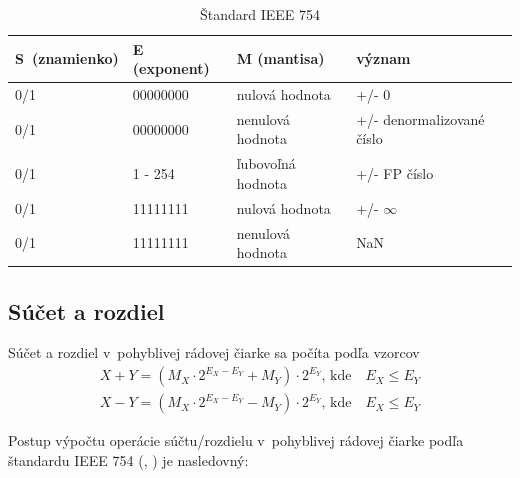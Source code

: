 \bigskip
\begin{table}[h]
\centering
\begin{tabular}{|l|l|l|l|}
\hline
\rowcolor[HTML]{C0C0C0} 
S~(znamienko) & E (exponent) & M (mantisa)       & význam                    \\ \hline
0/1           & 00000000     & nulová hodnota    & +/- 0                     \\ \hline
0/1           & 00000000     & nenulová hodnota  & +/- denormalizované číslo \\ \hline
0/1           & 1 - 254      & ľubovoľná hodnota & +/- FP číslo              \\ \hline
0/1           & 11111111     & nulová hodnota    & +/- $ \infty  $           \\ \hline
0/1           & 11111111     & nenulová hodnota  & NaN                       \\ \hline
\end{tabular}
\caption{Štandard IEEE 754 \cite{FPOnline}}
\label{standard_IEEE754}
\end{table}

\newpage
\subsection{Súčet a rozdiel} \label{PlusMinusFP}
Súčet a rozdiel v~pohyblivej rádovej čiarke sa počíta podľa vzorcov
\begin{eqnarray}
X + Y = (M_{X}\cdot 2^{E_{X} - E_{Y}} + M_{Y})\cdot 2^{E_{Y}} \text{, kde} \quad E_{X} \leq E_{Y} \\
X - Y = (M_{X}\cdot 2^{E_{X} - E_{Y}} - M_{Y})\cdot 2^{E_{Y}} \text{, kde} \quad E_{X} \leq E_{Y}
\end{eqnarray}

Postup výpočtu operácie súčtu/rozdielu v~pohyblivej rádovej čiarke podľa štandardu IEEE 754 (\cite{FPOnline_operacie}, \cite{CamborBP}) je nasledovný:


